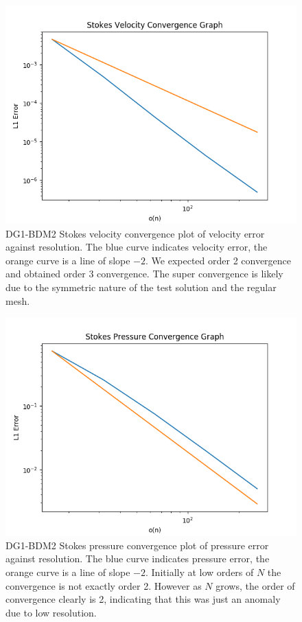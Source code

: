 \documentclass[11pt,twoside,a4paper]{article}
\begin{document}
\begin{figure}
  \includegraphics[width=\linewidth]{stokes_convergence_dbc0.png}
  \caption{DG1-BDM2 Stokes velocity convergence plot of velocity error against resolution. The blue curve indicates velocity error, the orange curve is a line of slope $-2$.  We expected order 2 convergence and obtained order 3 convergence. The super convergence is likely due to the symmetric nature of the test solution and the regular mesh.}
\end{figure}

\begin{figure}
\includegraphics[width=\linewidth]{stokes_pressure_convergence_dbc0.png}
  \caption{DG1-BDM2 Stokes pressure convergence plot of pressure error against resolution. The blue curve indicates pressure error, the orange curve is a line of slope $-2$.  Initially at low orders of $N$ the convergence is not exactly order 2. However as $N$ grows, the order of convergence clearly is 2, indicating that this was just an anomaly due to low resolution.}
\end{figure}
\end{document}
